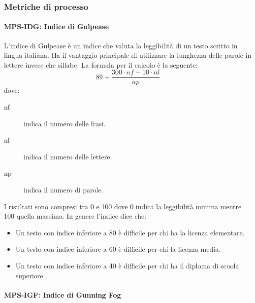 \documentclass[../norme-di-progetto.tex]{subfiles}
\begin{document}
\subsubsection{Metriche di processo}%
\label{subs:documentazione/metriche_di_processo}

\paragraph{MPS-IDG\@: Indice di Gulpease}%
\label{par:MPS-IDG_indice_di_Gulpease}

L'indice di Gulpease è un indice che valuta la leggibilità di un testo scritto in lingua italiana. Ha il vantaggio principale di utilizzare la lunghezza delle parole in lettere invece che sillabe. La formula per il calcolo è la seguente:
\[
  89 +\frac{300\cdot nf-10\cdot nl}{np}
\]
dove:
\begin{description}
  \item [nf] indica il numero delle frasi.
  \item [nl] indica il numero delle lettere.
  \item [np] indica il numero di parole.
\end{description}
I risultati sono compresi tra 0 e 100 dove 0 indica la leggibilità minima mentre 100 quella massima. In genere l'indice dice che:
\begin{itemize}
  \item Un testo con indice inferiore a 80 è difficile per chi ha la licenza elementare.
  \item Un testo con indice inferiore a 60 è difficile per chi la licenza media.
  \item Un testo con indice inferiore a 40 è difficile per chi ha il diploma di scuola superiore.
\end{itemize}
\paragraph{MPS-IGF\@: Indice di Gunning Fog}%
\label{par:MPS-IGF_indice_di_Gunning_Fog}
\end{document}
